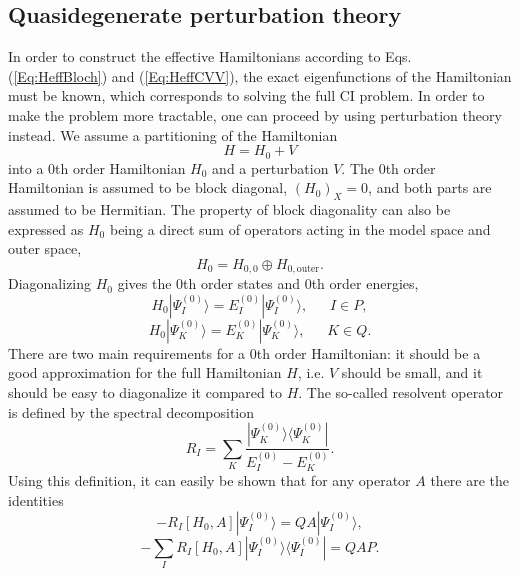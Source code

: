 \subsection{Quasidegenerate perturbation theory}
In order to construct the effective Hamiltonians according to Eqs. (\ref{Eq:HeffBloch}) and (\ref{Eq:HeffCVV}), the exact eigenfunctions of the Hamiltonian must be known, which corresponds to solving the full CI problem. In order to make the problem more tractable, one can proceed by using perturbation theory instead. We assume a partitioning of the Hamiltonian 
	\begin{equation}
	H = {H_0} + V
	\end{equation} 	
into a 0th order Hamiltonian $H_0$ and a perturbation $V$. The 0th order Hamiltonian is assumed to be block diagonal, ${({H_0})_X} = 0$, and both parts are assumed to be Hermitian. The property of block diagonality can also be expressed as $H_0$ being a direct sum of operators acting in the model space and outer space,
\begin{equation}
				{H_0} = {H_{0,0}} \oplus {H_{0,{\text{outer}}}}.
				\end{equation}
Diagonalizing $H_0$ gives the 0th order states and 0th order energies,
	\begin{equation}
	{H_0}|\Psi _I^{(0)}\rangle  = E_I^{(0)}|\Psi _I^{(0)}\rangle ,\quad \;\;I \in P,
	\end{equation} 	
	\begin{equation}
	{H_0}|\Psi _K^{(0)}\rangle  = E_K^{(0)}|\Psi _K^{(0)}\rangle ,\quad \;\;K \in Q.
	\end{equation}
There are two main requirements for a 0th order Hamiltonian: it should be a good approximation for the full Hamiltonian $H$, i.e. $V$ should be small, and it should be easy to diagonalize it compared to $H$.
The so-called resolvent operator is defined by the spectral decomposition
	\begin{equation}
	{R_I} = \sum\limits_K {\frac{{|\Psi _K^{(0)}\rangle \langle \Psi _K^{(0)}|}}{{E_I^{(0)} - E_K^{(0)}}}}. 
	\end{equation} 	
Using this definition, it can easily be shown that for any operator $A$ there are the identities\cite{ShaviR_1980_5711}
	\begin{equation}
	 - {R_I}[{H_0},A]|\Psi _I^{(0)}\rangle  = QA|\Psi _I^{(0)}\rangle, 
	 \end{equation} 	
	\begin{equation}
	\label{Eq:QAP_resolvent}
	 - \sum\limits_I {{R_I}} [{H_0},A]|\Psi _I^{(0)}\rangle \langle \Psi _I^{(0)}| = QAP.
	 \end{equation} 	
